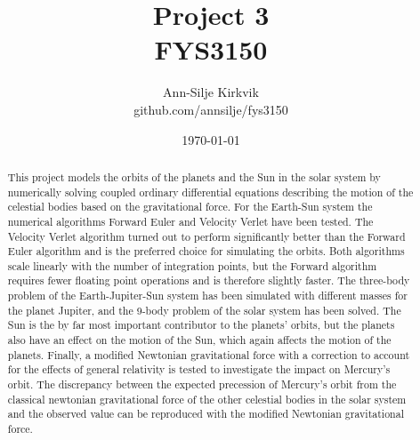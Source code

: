 \documentclass{article}
\begin{document}
\title{\vspace{1cm}Project 3 \\ FYS3150}

\author{\vspace{1cm}Ann-Silje Kirkvik \\ github.com/annsilje/fys3150}
\date{\vspace{5cm}\today}

\maketitle

\newpage

\begin{abstract}
This project models the orbits of the planets and the Sun in the solar system by numerically solving coupled ordinary differential equations describing the motion of the celestial bodies based on the gravitational force. For the Earth-Sun system the numerical algorithms Forward Euler and Velocity Verlet have been tested. The Velocity Verlet algorithm turned out to perform significantly better than the Forward Euler algorithm and is the preferred choice for simulating the orbits. Both algorithms scale linearly with the number of integration points, but the Forward algorithm requires fewer floating point operations and is therefore slightly faster. The three-body problem of the Earth-Jupiter-Sun system has been simulated with different masses for the planet Jupiter, and the 9-body problem of the solar system has been solved. The Sun is the by far most important contributor to the planets' orbits, but the planets also have an effect on the motion of the Sun, which again affects the motion of the planets. Finally, a modified Newtonian gravitational force with a correction to account for the effects of general relativity is tested to investigate the impact on Mercury's orbit. The discrepancy between the expected precession of Mercury's orbit from the classical newtonian gravitational force of the other celestial bodies in the solar system and the observed value can be reproduced with the modified Newtonian gravitational force.
\end{abstract}

\vspace{1cm}
\end{document}
